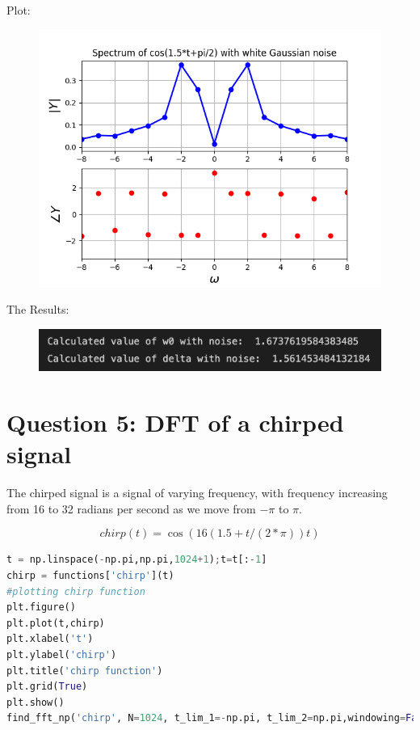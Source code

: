 \documentclass[11pt, a4paper]{article}
\begin{document}
Plot:
\begin{figure}[H]
     \centering
     \includegraphics[scale=0.8]{Figure_7.png}
\end{figure}

The Results:
\begin{figure}[H]
     \centering
     \includegraphics[scale=0.6]{Figure_11.png}
\end{figure}

\section{Question 5: DFT of a chirped signal}
The chirped signal is a signal of varying frequency, with frequency increasing
from 16 to 32 radians per second as we move from $-\pi$ to $\pi$.

\[chirp(t) = \cos(16(1.5+ t/(2*\pi))t)\]

\begin{lstlisting}[language = Python]
t = np.linspace(-np.pi,np.pi,1024+1);t=t[:-1]
chirp = functions['chirp'](t)
#plotting chirp function
plt.figure()
plt.plot(t,chirp)
plt.xlabel('t')
plt.ylabel('chirp')
plt.title('chirp function')
plt.grid(True)
plt.show()
find_fft_np('chirp', N=1024, t_lim_1=-np.pi, t_lim_2=np.pi,windowing=False, x_limit = 50)

\end{lstlisting}
\end{document}
